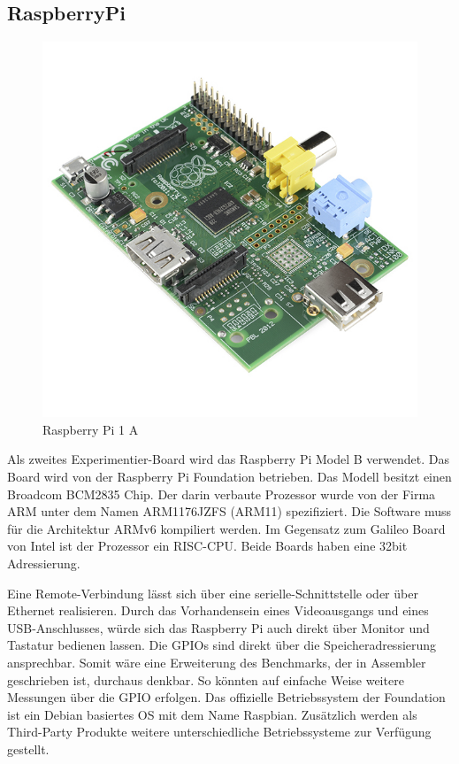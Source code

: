 \subsection{RaspberryPi}


\begin{figure}
\centering
\includegraphics[scale=0.4]{images/raspberry-pi-2.png}
\caption{Raspberry Pi 1 A\cite{raspberry_image}}
\label{fig:Raspberry Pi 1 A}
\end{figure}


Als zweites Experimentier-Board wird das Raspberry Pi Model B\cite{raspberry_foundation} verwendet. Das Board wird von der Raspberry Pi Foundation betrieben. Das Modell besitzt einen Broadcom BCM2835\cite{broadcom_datasheet} Chip. Der darin verbaute Prozessor wurde von der Firma ARM unter dem Namen ARM1176JZFS\cite{arm_datasheet} (ARM11) spezifiziert. Die Software muss für die Architektur ARMv6 kompiliert werden. Im Gegensatz zum Galileo Board von Intel ist der Prozessor ein RISC-CPU. Beide Boards haben eine 32bit Adressierung.
\par
Eine Remote-Verbindung lässt sich über eine serielle-Schnittstelle oder über Ethernet realisieren. Durch das Vorhandensein eines Videoausgangs und eines USB-Anschlusses, würde sich das Raspberry Pi auch direkt über Monitor und Tastatur bedienen lassen. Die GPIOs sind direkt über die Speicheradressierung ansprechbar. Somit wäre eine Erweiterung des Benchmarks, der in Assembler geschrieben ist, durchaus denkbar. So könnten auf einfache Weise weitere Messungen über die GPIO erfolgen. Das offizielle Betriebssystem der Foundation ist ein Debian basiertes OS mit dem Name Raspbian. Zusätzlich werden als Third-Party Produkte weitere unterschiedliche Betriebssysteme zur Verfügung gestellt. 











